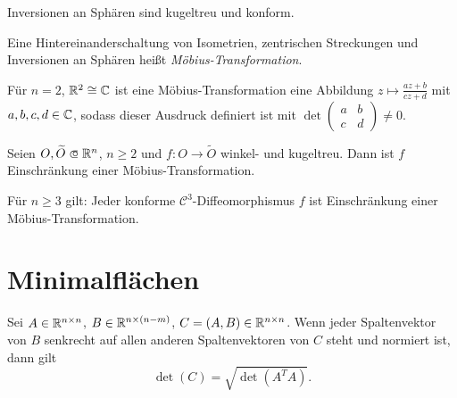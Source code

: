 \documentclass{cheat-sheet}
\begin{document}
\begin{lem}
  Inversionen an Sphären sind kugeltreu und konform.
\end{lem}

\begin{defn}
  Eine Hintereinanderschaltung von Isometrien, zentrischen Streckungen und Inversionen an Sphären heißt \emph{Möbius-Transformation}.
\end{defn}

\begin{bem}
  Für $n = 2$, $\mathbb{R}^2 \cong \mathbb{C}$ ist eine Möbius-Transformation eine Abbildung $z \mapsto \tfrac{az+b}{cz+d}$ mit $a, b, c, d \in \mathbb{C}$, sodass dieser Ausdruck definiert ist mit $\det \left( \begin{smallmatrix} a & b \\ c & d \end{smallmatrix} \right) \not= 0$.
\end{bem}

\begin{satz}
  Seien $O, \widetilde{O} \opn \R^n$, $n \geq 2$ und $f : O \to \widetilde{O}$ winkel- und kugeltreu. Dann ist $f$ Einschränkung einer Möbius-Transformation.
\end{satz}

\begin{kor}
  Für $n \geq 3$ gilt: Jeder konforme $\mathcal{C}^3$-Diffeomorphismus $f$ ist Einschränkung einer Möbius-Transformation.
\end{kor}


\section{Minimalflächen}

\begin{lem}
  Sei $A \in \mathbb{R}^{n \times n}$, $B \in \mathbb{R}^{n \times (n-m)}$, $C = (A, B) \in \mathbb{R}^{n \times n}$. Wenn jeder Spaltenvektor von $B$ senkrecht auf allen anderen Spaltenvektoren von $C$ steht und normiert ist, dann gilt
  \[ \det(C) = \sqrt{ \det(A^T A) }. \]
\end{lem}




\end{document}
